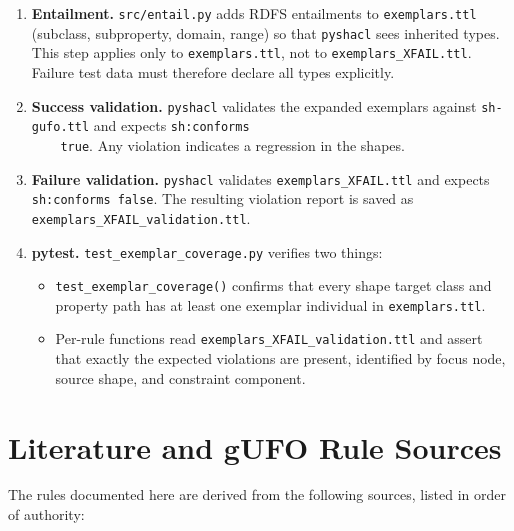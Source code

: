 \documentclass[12pt,a4paper]{article}
\begin{document}
\begin{enumerate}
  \item \textbf{Entailment.} \texttt{src/entail.py} adds RDFS entailments to
    \texttt{exemplars.ttl} (subclass, subproperty, domain, range) so that
    \texttt{pyshacl} sees inherited types. This step applies only to
    \texttt{exemplars.ttl}, not to \texttt{exemplars\_XFAIL.ttl}. Failure test
    data must therefore declare all types explicitly.

  \item \textbf{Success validation.} \texttt{pyshacl} validates the expanded
    exemplars against \texttt{sh-gufo.ttl} and expects \nolinkurl{sh:conforms
    true}. Any violation indicates a regression in the shapes.

  \item \textbf{Failure validation.} \texttt{pyshacl} validates
    \texttt{exemplars\_XFAIL.ttl} and expects \nolinkurl{sh:conforms false}. The
    resulting violation report is saved as
    \texttt{exemplars\_XFAIL\_validation.ttl}.

  \item \textbf{pytest.} \texttt{test\_exemplar\_coverage.py} verifies two
    things:
    \begin{itemize}
      \item \texttt{test\_exemplar\_coverage()} confirms that every shape
        target class and property path has at least one exemplar individual
        in \texttt{exemplars.ttl}.
      \item Per-rule functions read \texttt{exemplars\_XFAIL\_validation.ttl}
        and assert that exactly the expected violations are present,
        identified by focus node, source shape, and constraint component.
    \end{itemize}
\end{enumerate}

\section{Literature and gUFO Rule Sources}

The rules documented here are derived from the following sources, listed in
order of authority:
\end{document}
